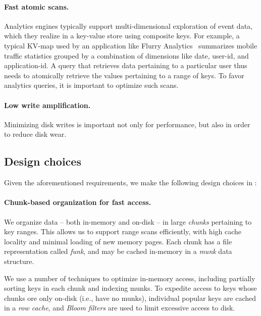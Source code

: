 \paragraph{Fast atomic scans.}
 Analytics engines typically support multi-dimensional exploration of event data, which they realize in a key-value store using composite keys.   For example, a typical  KV-map used by an application like Flurry Analytics~\cite{flurry} 
  summarizes mobile traffic statistics grouped by a combination of dimensions like  date,  user-id, and application-id.
A query that retrieves data pertaining to a particular user thus needs to atomically 
retrieve the values pertaining to a range of keys. 
 To favor analytics queries, it is important to optimize  such scans. 
 
 \paragraph{Low write amplification.} 
 Minimizing disk writes is important not only for performance, but also in order to reduce disk wear.


\subsection{Design choices}

Given the aforementioned requirements, we make the following design choices in \sys:

\paragraph{Chunk-based organization for fast access.}
We organize data --  both in-memory and on-disk --  in large \emph{chunks}  pertaining to  key ranges.  This allows us to support range scans efficiently, with  high cache locality and minimal loading of new memory pages. 
Each chunk has a file representation called  \emph{funk}, and may be cached in-memory in a  \emph{munk} data structure.

We use a number of techniques to optimize in-memory  access, including partially sorting keys in each chunk and 
indexing munks. 
To expedite access to  keys whose chunks ore only on-disk  (i.e., have no munks), 
individual popular keys are cached in a \emph{row cache}, 
and \emph{Bloom filters} are used to limit excessive access to disk. 



